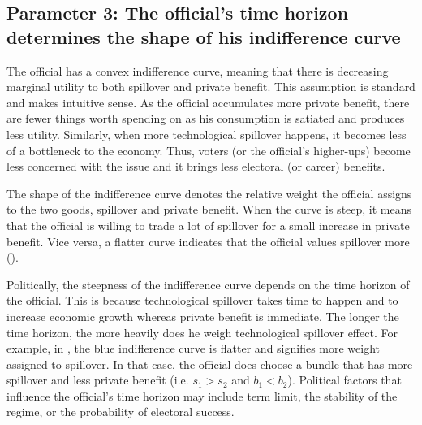\subsection{Parameter 3: The official's time horizon determines the shape of his indifference curve}

The official has a convex indifference curve, meaning that there is decreasing marginal utility to both spillover and private benefit. This assumption is standard and makes intuitive sense. As the official accumulates more private benefit, there are fewer things worth spending on as his consumption is satiated and produces less utility. Similarly, when more technological spillover happens, it becomes less of a bottleneck to the economy. Thus, voters (or the official's higher-ups) become less concerned with the issue and it brings less electoral (or career) benefits.

The shape of the indifference curve denotes the relative weight the official assigns to the two goods, spillover and private benefit. When the curve is steep, it means that the official is willing to trade a lot of spillover for a small increase in private benefit. Vice versa, a flatter curve indicates that the official values spillover more ().

Politically, the steepness of the indifference curve depends on the time horizon of the official. This is because technological spillover takes time to happen and to increase economic growth whereas private benefit is immediate. The longer the time horizon, the more heavily does he weigh technological spillover effect. For example, in , the blue indifference curve is flatter and signifies more weight assigned to spillover. In that case, the official does choose a bundle that has more spillover and less private benefit (i.e. $s_1 > s_2$ and $b_1 < b_2$). Political factors that influence the official's time horizon may include term limit, the stability of the regime, or the probability of electoral success. 

